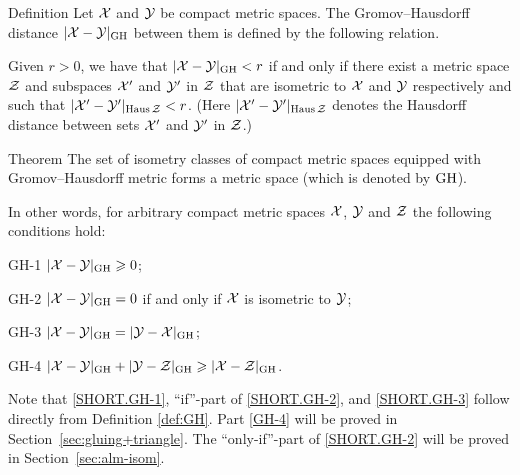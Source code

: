 \begin{thm}{Definition}\label{def:GH}
Let $\mathcal{X}$ and $\mathcal{Y}$ be compact metric spaces. 
The Gromov--Hausdorff distance $|\mathcal{X}-\mathcal{Y}|_{\operatorname{\rm GH}\nolimits}$
between them is defined by the following
relation.
 
Given  $r > 0$, we have that $|\mathcal{X}-\mathcal{Y}|_{\operatorname{\rm GH}\nolimits} < r$ if and only if there exist a metric
space $\mathcal{Z}$ and subspaces $\mathcal{X}'$ and $\mathcal{Y}'$ in $\mathcal{Z}$ that are isometric to $\mathcal{X}$ and $\mathcal{Y}$
respectively and such that $|\mathcal{X}'-\mathcal{Y}'|_{\operatorname{\rm Haus}\nolimits\mathcal{Z}} < r$. 
(Here $|\mathcal{X}'-\mathcal{Y}'|_{\operatorname{\rm Haus}\nolimits\mathcal{Z}}$ denotes the Hausdorff distance between sets $\mathcal{X}'$ and $\mathcal{Y}'$ in $\mathcal{Z}$.)
\end{thm}

\begin{thm}{Theorem}\label{thm:GH-is-a-metric}
The set of isometry classes of compact metric spaces equipped with Gromov--Hausdorff metric forms a metric space (which is denoted by $\operatorname{\rm GH}\nolimits$).

In other words, for arbitrary  compact metric spaces $\mathcal{X}$, $\mathcal{Y}$ and $\mathcal{Z}$ the following conditions hold:

\begin{subthm}{GH-1} $|\mathcal{X}-\mathcal{Y}|_{\operatorname{\rm GH}\nolimits}\geqslant 0$;
\end{subthm}

\begin{subthm}{GH-2} $|\mathcal{X}-\mathcal{Y}|_{\operatorname{\rm GH}\nolimits}=0$ if and only if $\mathcal{X}$ is isometric to $\mathcal{Y}$;
\end{subthm}

\begin{subthm}{GH-3} $|\mathcal{X}-\mathcal{Y}|_{\operatorname{\rm GH}\nolimits}=|\mathcal{Y}-\mathcal{X}|_{\operatorname{\rm GH}\nolimits}$;
\end{subthm}

\begin{subthm}{GH-4} $|\mathcal{X}-\mathcal{Y}|_{\operatorname{\rm GH}\nolimits}+|\mathcal{Y}-\mathcal{Z}|_{\operatorname{\rm GH}\nolimits}\geqslant |\mathcal{X}-\mathcal{Z}|_{\operatorname{\rm GH}\nolimits}$.
\end{subthm}
\end{thm}


Note that \ref{SHORT.GH-1}, ``if''-part of \ref{SHORT.GH-2}, and \ref{SHORT.GH-3} follow directly from Definition \ref{def:GH}.
Part \ref{GH-4} will be proved in Section~\ref{sec:gluing+triangle}.
The ``only-if''-part of \ref{SHORT.GH-2} will be proved in Section~\ref{sec:alm-isom}.

